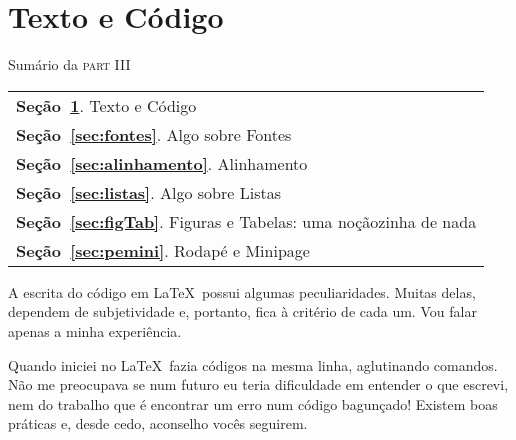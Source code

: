 \section{Texto e Código} %
\label{sec:textoCodigo}

\begin{margintable}\vspace{.8in}\footnotesize
  \caption{Sumário da \textsc{part III}}
  \medskip
  \begin{tabularx}{\marginparwidth}{|X}
    \textbf{\sffamily \textcolor{azulUFRB}{Seção}~\ref{sec:textoCodigo}}. {\sffamily Texto e Código} \\
    \textbf{\sffamily \textcolor{azulUFRB}{Seção}~\ref{sec:fontes}}.      {\sffamily Algo sobre Fontes} \\
    \textbf{\sffamily \textcolor{azulUFRB}{Seção}~\ref{sec:alinhamento}}. {\sffamily Alinhamento} \\
    \textbf{\sffamily \textcolor{azulUFRB}{Seção}~\ref{sec:listas}}.      {\sffamily Algo sobre Listas} \\
    \textbf{\sffamily \textcolor{azulUFRB}{Seção}~\ref{sec:figTab}}.      {\sffamily Figuras e Tabelas: uma noçãozinha de nada} \\
    \textbf{\sffamily \textcolor{azulUFRB}{Seção}~\ref{sec:pemini}}.      {\sffamily Rodapé e Minipage} \\
  \end{tabularx}
\end{margintable}

A escrita do código em \LaTeX\ possui algumas peculiaridades.
Muitas delas, dependem de subjetividade e, portanto, fica à critério de cada um.
Vou falar apenas a minha experiência.

Quando iniciei no \LaTeX\ fazia códigos na mesma linha, aglutinando comandos.
Não me preocupava se num futuro eu teria dificuldade em entender o que escrevi, 
nem do trabalho que é encontrar um erro num código bagunçado!
Existem boas práticas e, desde cedo, aconselho vocês seguirem.

